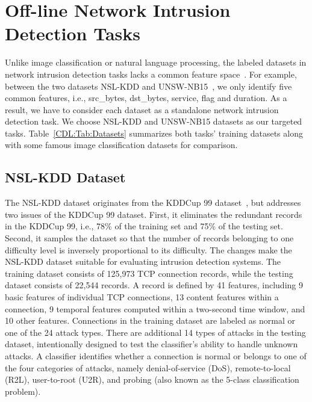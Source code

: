 \section{Off-line Network Intrusion Detection Tasks}
Unlike image classification or natural language processing,
the labeled datasets in network intrusion detection tasks lacks a common feature space~\cite{KDDCup, DARPA, UNSW, NSL-KDD}.
For example, between the two datasets NSL-KDD\cite{NSL-KDD} and UNSW-NB15~\cite{UNSW},
we only identify five common features, i.e., src\_bytes, dst\_bytes, service, flag and duration.
As a result, we have to consider each dataset as a standalone network intrusion detection task.
We choose NSL-KDD and UNSW-NB15 datasets as our targeted tasks.
Table~\ref{CDL:Tab:Datasets} summarizes both tasks' training datasets along with some famous image classification datasets for comparison.

\subsection{NSL-KDD Dataset}
The NSL-KDD dataset originates from the KDDCup 99 dataset~\cite{KDDCup},
but addresses two issues of the KDDCup 99 dataset.
First, it eliminates the redundant records in the KDDCup 99, i.e., 
78\% of the training set and 75\% of the testing set.
Second, it samples the dataset so that the number of records belonging to one difficulty level is inversely proportional to its difficulty.
The changes make the NSL-KDD dataset suitable for evaluating intrusion detection systems.
The training dataset consists of 125,973 TCP connection records, while the testing dataset consists of 22,544 records.
A record is defined by 41 features, including 9 basic features of individual TCP connections, 13 content features within a connection, 9 temporal features computed within a two-second time window, and 10 other features.
Connections in the training dataset are labeled as normal or one of the 24 attack types.
There are additional 14 types of attacks in the testing dataset, intentionally designed to test the classifier's ability to handle unknown attacks.
A classifier identifies whether a connection is normal or belongs to one of the four categories of attacks, namely denial-of-service (DoS), remote-to-local (R2L), user-to-root (U2R), and probing (also known as the 5-class classification problem).

